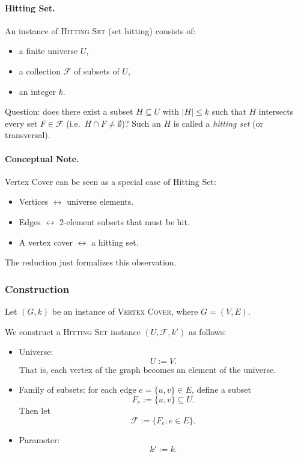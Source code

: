 \documentclass[9pt]{extarticle}
\begin{document}
\paragraph{Hitting Set.}
An instance of \textsc{Hitting Set} (set hitting) consists of:
\begin{itemize}
    \item a finite universe $U$,
    \item a collection $\mathcal{F}$ of subsets of $U$,
    \item an integer $k$.
\end{itemize}
Question: does there exist a subset $H \subseteq U$ with $|H| \le k$ such that
$H$ intersects every set $F \in \mathcal{F}$ (i.e.\ $H \cap F \ne \emptyset$)?
Such an $H$ is called a \emph{hitting set} (or transversal).

\paragraph{Conceptual Note.}
Vertex Cover can be seen as a special case of Hitting Set:
\begin{itemize}
    \item Vertices $\leftrightarrow$ universe elements.
    \item Edges $\leftrightarrow$ 2-element subsets that must be hit.
    \item A vertex cover $\leftrightarrow$ a hitting set.
\end{itemize}
The reduction just formalizes this observation.

\subsubsection*{Construction}

Let $(G,k)$ be an instance of \textsc{Vertex Cover}, where $G=(V,E)$.

We construct a \textsc{Hitting Set} instance $(U,\mathcal{F},k')$ as follows:

\begin{itemize}
    \item Universe:
    \[
        U := V.
    \]
    That is, each vertex of the graph becomes an element of the universe.

    \item Family of subsets:
    for each edge $e = \{u,v\} \in E$, define a subset
    \[
        F_e := \{u, v\} \subseteq U.
    \]
    Then let
    \[
        \mathcal{F} := \{ F_e : e \in E \}.
    \]

    \item Parameter:
    \[
        k' := k.
    \]
\end{itemize}
\end{document}
